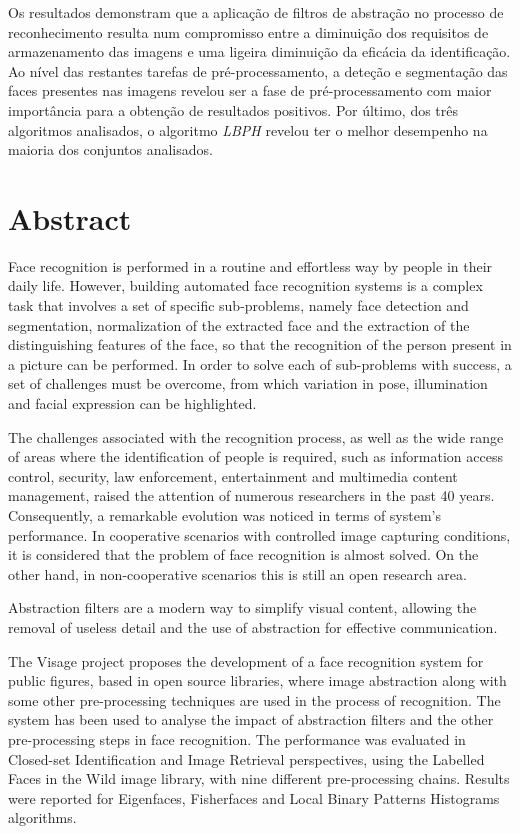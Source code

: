 Os resultados demonstram que a aplicação de filtros de abstração no processo de reconhecimento resulta num compromisso entre a diminuição dos requisitos de armazenamento das imagens e uma ligeira diminuição da eficácia da identificação. Ao nível das restantes tarefas de pré-processamento, a deteção e segmentação das faces presentes nas imagens revelou ser a fase de pré-processamento com maior importância para a obtenção de resultados positivos. Por último, dos três algoritmos analisados, o algoritmo \textit{LBPH} revelou ter o melhor desempenho na maioria dos conjuntos analisados.

\chapter*{Abstract}
Face recognition is performed in a routine and effortless way by people in their daily life. However, building automated face recognition systems is a complex task that involves a set of specific sub-problems, namely face detection and segmentation, normalization of the extracted face and the extraction of the distinguishing features of the face, so that the recognition of the person present in a picture can be performed. In order to solve each of sub-problems with success, a set of challenges must be overcome, from which variation in pose, illumination and facial expression can be highlighted.

The challenges associated with the recognition process, as well as the wide range of areas where the identification of people is required, such as information access control, security, law enforcement, entertainment and multimedia content management, raised the attention of numerous researchers in the past 40 years. Consequently, a remarkable evolution was noticed in terms of system's performance. In cooperative scenarios with controlled image capturing conditions, it is considered that the problem of face recognition is almost solved. On the other hand,  in non-cooperative scenarios this is still an open research area.

Abstraction filters are a modern way to simplify visual content, allowing the removal of useless detail and the use of abstraction for effective communication.

The Visage project proposes the development of a face recognition system for public figures, based in open source libraries, where image abstraction along with some other pre-processing techniques are used in the process of recognition. The system has been used to analyse the impact of abstraction filters and the other pre-processing steps in face recognition. The performance was evaluated in Closed-set Identification and Image Retrieval perspectives, using the Labelled Faces in the Wild image library, with nine different pre-processing chains. Results were reported for Eigenfaces, Fisherfaces and Local Binary Patterns Histograms algorithms.

